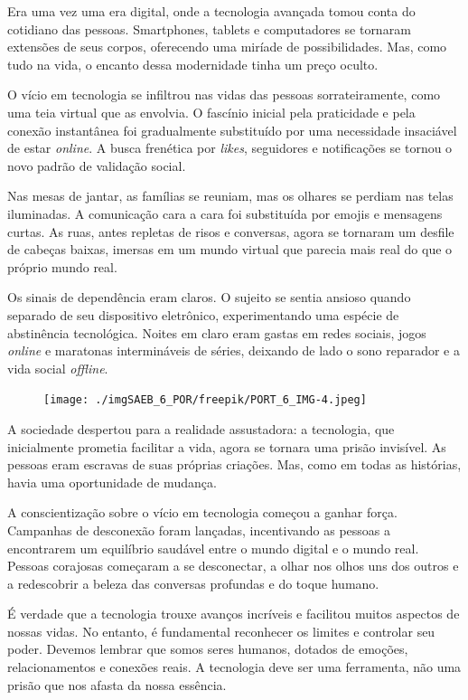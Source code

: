 \begin{myquote}
Era uma vez uma era digital, onde a tecnologia avançada tomou conta do
cotidiano das pessoas. Smartphones, tablets e computadores se tornaram
extensões de seus corpos, oferecendo uma miríade de possibilidades. Mas,
como tudo na vida, o encanto dessa modernidade tinha um preço oculto.

O vício em tecnologia se infiltrou nas vidas das pessoas
sorrateiramente, como uma teia virtual que as envolvia. O fascínio
inicial pela praticidade e pela conexão instantânea foi gradualmente
substituído por uma necessidade insaciável de estar \emph{online}. A busca
frenética por \emph{likes}, seguidores e notificações se tornou o novo padrão
de validação social.

Nas mesas de jantar, as famílias se reuniam, mas os olhares se perdiam
nas telas iluminadas. A comunicação cara a cara foi substituída por
emojis e mensagens curtas. As ruas, antes repletas de risos e conversas,
agora se tornaram um desfile de cabeças baixas, imersas em um mundo
virtual que parecia mais real do que o próprio mundo real.

Os sinais de dependência eram claros. O sujeito se sentia ansioso quando
separado de seu dispositivo eletrônico, experimentando uma espécie de
abstinência tecnológica. Noites em claro eram gastas em redes sociais,
jogos \emph{online} e maratonas intermináveis de séries, deixando de lado o
sono reparador e a vida social \emph{offline}.

\begin{figure}[H]
\centering\texttt{[image: ./imgSAEB\_6\_POR/freepik/PORT\_6\_IMG-4.jpeg]}
\end{figure}

A sociedade despertou para a realidade assustadora: a tecnologia, que
inicialmente prometia facilitar a vida, agora se tornara uma prisão
invisível. As pessoas eram escravas de suas próprias criações. Mas, como
em todas as histórias, havia uma oportunidade de mudança.

A conscientização sobre o vício em tecnologia começou a ganhar força.
Campanhas de desconexão foram lançadas, incentivando as pessoas a
encontrarem um equilíbrio saudável entre o mundo digital e o mundo real.
Pessoas corajosas começaram a se desconectar, a olhar nos olhos uns dos
outros e a redescobrir a beleza das conversas profundas e do toque
humano.


É verdade que a tecnologia trouxe avanços incríveis e facilitou muitos
aspectos de nossas vidas. No entanto, é fundamental reconhecer os
limites e controlar seu poder. Devemos lembrar que somos seres humanos,
dotados de emoções, relacionamentos e conexões reais. A tecnologia deve
ser uma ferramenta, não uma prisão que nos afasta da nossa essência.



\end{myquote}
